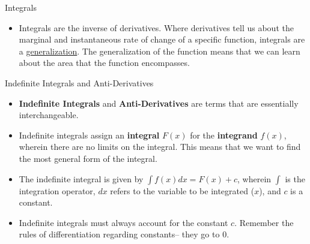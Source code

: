 \documentclass[
  ignorenonframetext,
]{beamer}
\providecommand{\tightlist}{%
  \setlength{\itemsep}{0pt}\setlength{\parskip}{0pt}}
\begin{document}
\begin{frame}{Integrals}
\protect\hypertarget{integrals}{}
\begin{itemize}[<+->]
\tightlist
\item
  Integrals are the inverse of derivatives. Where derivatives tell us
  about the marginal and instantaneous rate of change of a specific
  function, integrals are a
  \href{https://mathworld.wolfram.com/Integral.html}{generalization}.
  The generalization of the function means that we can learn about the
  area that the function encompasses.
\end{itemize}
\end{frame}

\begin{frame}{Indefinite Integrals and Anti-Derivatives}
\protect\hypertarget{indefinite-integrals-and-anti-derivatives}{}
\begin{itemize}[<+->]
\tightlist
\item
  \textbf{Indefinite Integrals} and \textbf{Anti-Derivatives} are terms
  that are essentially interchangeable.
\end{itemize}

\begin{itemize}[<+->]
\tightlist
\item
  Indefinite integrals assign an \textbf{integral} \(F(x)\) for the
  \textbf{integrand} \(f(x)\), wherein there are no limits on the
  integral. This means that we want to find the most general form of the
  integral.
\end{itemize}

\begin{itemize}[<+->]
\tightlist
\item
  The indefinite integral is given by \(\int f(x) dx = F(x) + c\),
  wherein \(\int\) is the integration operator, \(dx\) refers to the
  variable to be integrated (\(x\)), and \(c\) is a constant.
\end{itemize}

\begin{itemize}[<+->]
\tightlist
\item
  Indefinite integrals must always account for the constant \(c\).
  Remember the rules of differentiation regarding constants-- they go to
  0.
\end{itemize}
\end{frame}
\end{document}
